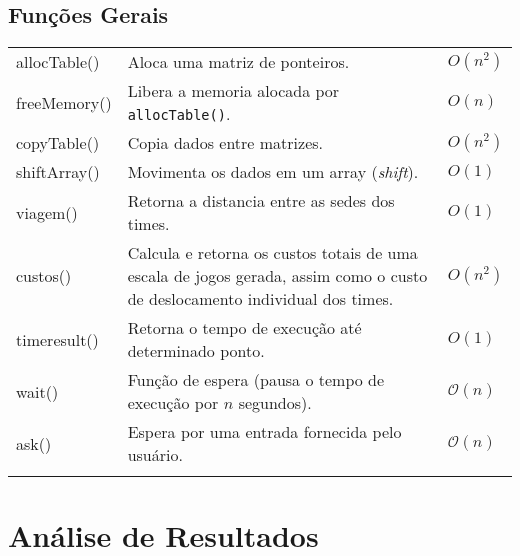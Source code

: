 \documentclass[12pt,a4paper]{article}
\numberwithin{figure}{section}
\numberwithin{table}{section}
\begin{document}
\subsection{Funções Gerais}

\begin{longtable}{>{\ttfamily}p{3cm} p{11cm} p{1cm}}
	allocTable() & Aloca uma matriz de ponteiros. & $O(n^2)$ \\
	freeMemory() & Libera a memoria alocada por \texttt{allocTable()}. & $O(n)$ \\
	copyTable() & Copia dados entre matrizes. & $O(n^2)$ \\
	shiftArray() & Movimenta os dados em um array (\textit{shift}). & $O(1)$ \\
	viagem() & Retorna a distancia entre as sedes dos times. & $O(1)$ \\
	custos() & Calcula e retorna os custos totais de uma escala de jogos gerada, assim como o custo de deslocamento individual dos times. & $O(n^2)$ \\
	timeresult() & Retorna o tempo de execução até determinado ponto. & $O(1)$ \\
	wait() & Função de espera (pausa o tempo de execução por $n$ segundos). & $\mathcal{O}(n)$ \\
	ask() & Espera por uma entrada fornecida pelo usuário. & $\mathcal{O}(n)$ \\
	\label{tab:comum}
\end{longtable}

\section{Análise de Resultados}
\end{document}
